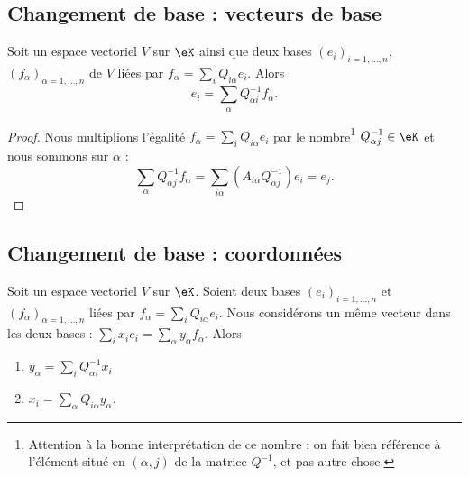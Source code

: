 \subsection{Changement de base : vecteurs de base}

\begin{lemma}       \label{LEMooIHZGooOZoYZd}
    Soit un espace vectoriel \( V\) sur \( \eK\) ainsi que deux bases \( (e_i)_{i=1,\ldots, n}\), \( (f_{\alpha})_{\alpha=1,\ldots, n}\) de \( V\) liées par \( f_{\alpha}=\sum_iQ_{i\alpha}e_i\). Alors
    \begin{equation}    \label{EQooZQPAooAbKAdg}
        e_i=\sum_{\alpha}Q^{-1}_{\alpha i}f_{\alpha}.
    \end{equation}
\end{lemma}

\begin{proof}
    Nous multiplions l'égalité \( f_{\alpha}=\sum_iQ_{i\alpha}e_i\) par le nombre\footnote{Attention à la bonne interprétation de ce nombre : on fait bien référence à l'élément situé en \( (\alpha, j) \) de la matrice \( Q^{-1} \), et pas autre chose.} \( Q^{-1}_{\alpha j}\in \eK\)  et nous sommons sur \( \alpha\) :
    \begin{equation}
        \sum_{\alpha}Q^{-1}_{\alpha j}f_{\alpha}=\sum_{i\alpha}(A_{i\alpha}Q^{-1}_{\alpha j})e_i=e_j.
    \end{equation}
\end{proof}

\subsection{Changement de base : coordonnées}

\begin{proposition}     \label{PROPooNYYOooHqHryX}
    Soit un espace vectoriel \( V\) sur \( \eK\). Soient deux bases \( (e_i)_{i=1,\ldots, n}\) et \( (f_{\alpha})_{\alpha=1,\ldots, n}\) liées par \( f_{\alpha}=\sum_iQ_{i\alpha}e_i\). Nous considérons un même vecteur dans les deux bases : \( \sum_ix_ie_i=\sum_{\alpha}y_{\alpha}f_{\alpha}\). Alors
    \begin{enumerate}
        \item       \label{ITEMooIBAEooNaUnPD}
            \( y_{\alpha}=\sum_iQ^{-1}_{\alpha i}x_i\)
        \item       \label{ITEMooKPWTooMwdbPu}
            $x_i=\sum_{\alpha}Q_{i\alpha}y_{\alpha}$.
    \end{enumerate}
\end{proposition}

